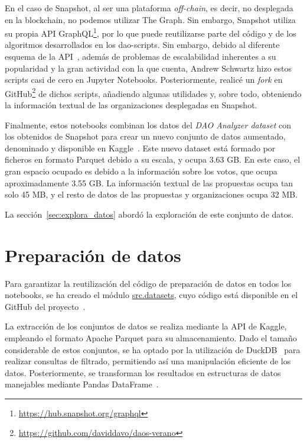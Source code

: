 En el caso de Snapshot, al ser una plataforma \textit{off-chain}, es decir, no desplegada en la blockchain, no podemos utilizar The Graph. Sin embargo, Snapshot utiliza su propia API GraphQL\footnote{\url{https://hub.snapshot.org/graphql}}, por lo que puede reutilizarse parte del código y de los algoritmos desarrollados en los dao-scripts. Sin embargo, debido al diferente esquema de la API~\cite{snapshot_snapshot_nodate}, además de problemas de escalabilidad inherentes a su popularidad y la gran actividad con la que cuenta, Andrew Schwartz hizo estos scripts casi de cero en Jupyter Notebooks. Posteriormente, realicé un \textit{fork} en GitHub\footnote{\url{https://github.com/daviddavo/daos-verano}} de dichos scripts, añadiendo algunas utilidades y, sobre todo, obteniendo la información textual de las organizaciones desplegadas en Snapshot.

Finalmente, estos notebooks combinan los datos del \textit{DAO Analyzer dataset} con los obtenidos de Snapshot para crear un nuevo conjunto de datos aumentado, denominado  y disponible en Kaggle~\cite{tfm-dataset-text}. Este nuevo dataset está formado por ficheros en formato Parquet debido a su escala, y ocupa 3.63 GB. En este caso, el gran espacio ocupado es debido a la información sobre los votos, que ocupa aproximadamente 3.55 GB. La información textual de las propuestas ocupa tan solo 45 MB, y el resto de datos de las propuestas y organizaciones ocupa 32 MB.

La sección~\ref{sec:explora_datos} abordó la exploración de este conjunto de datos.

\section{Preparación de datos}

Para garantizar la reutilización del código de preparación de datos en todos los notebooks, se ha creado el módulo \url{src.datasets}, cuyo código está disponible en el GitHub del proyecto~\cite{davo_daviddavoupm-tfm-notebooks_2024}.

La extracción de los conjuntos de datos se realiza mediante la API de Kaggle, empleando el formato Apache Parquet para su almacenamiento. Dado el tamaño considerable de estos conjuntos, se ha optado por la utilización de DuckDB~\cite{raasveldt_duckdb_2023} para realizar consultas de filtrado, permitiendo así una manipulación eficiente de los datos. Posteriormente, se transforman los resultados en estructuras de datos manejables mediante Pandas DataFrame~\cite{mckinney_data_2010}.

